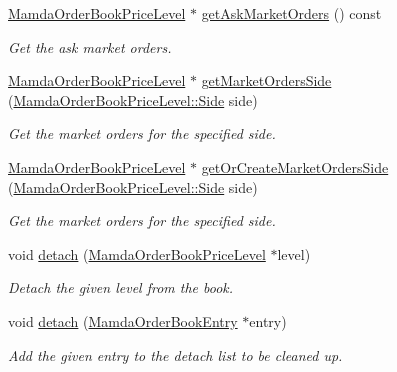 \begin{CompactItemize}
\hyperlink{classWombat_1_1MamdaOrderBookPriceLevel}{Mamda\-Order\-Book\-Price\-Level} $\ast$ \hyperlink{classWombat_1_1MamdaOrderBook_29562e102bf76cde4eae4d13f74c88fd}{get\-Ask\-Market\-Orders} () const 
\begin{CompactList}\small\item\em Get the ask market orders. \item\end{CompactList}\item 
\hyperlink{classWombat_1_1MamdaOrderBookPriceLevel}{Mamda\-Order\-Book\-Price\-Level} $\ast$ \hyperlink{classWombat_1_1MamdaOrderBook_819621cc76a4c07cf4f5fff5d3ec9b66}{get\-Market\-Orders\-Side} (\hyperlink{classWombat_1_1MamdaOrderBookPriceLevel_384c34b0a74d874b8969dee9b0d3718d}{Mamda\-Order\-Book\-Price\-Level::Side} side)
\begin{CompactList}\small\item\em Get the market orders for the specified side. \item\end{CompactList}\item 
\hyperlink{classWombat_1_1MamdaOrderBookPriceLevel}{Mamda\-Order\-Book\-Price\-Level} $\ast$ \hyperlink{classWombat_1_1MamdaOrderBook_27ab4bac9193b18a3081bae39ccb3cf2}{get\-Or\-Create\-Market\-Orders\-Side} (\hyperlink{classWombat_1_1MamdaOrderBookPriceLevel_384c34b0a74d874b8969dee9b0d3718d}{Mamda\-Order\-Book\-Price\-Level::Side} side)
\begin{CompactList}\small\item\em Get the market orders for the specified side. \item\end{CompactList}\item 
void \hyperlink{classWombat_1_1MamdaOrderBook_503c960afbcdea3ddae2d58812a41708}{detach} (\hyperlink{classWombat_1_1MamdaOrderBookPriceLevel}{Mamda\-Order\-Book\-Price\-Level} $\ast$level)
\begin{CompactList}\small\item\em Detach the given level from the book. \item\end{CompactList}\item 
void \hyperlink{classWombat_1_1MamdaOrderBook_d24551ff578bd714feb260dc1a5db8a0}{detach} (\hyperlink{classWombat_1_1MamdaOrderBookEntry}{Mamda\-Order\-Book\-Entry} $\ast$entry)
\begin{CompactList}\small\item\em Add the given entry to the detach list to be cleaned up. \item\end{CompactList}\item 

\end{CompactItemize}
